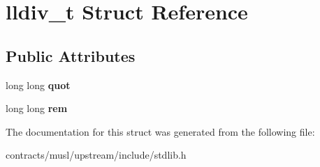 \hypertarget{structlldiv__t}{}\section{lldiv\+\_\+t Struct Reference}
\label{structlldiv__t}
\subsection*{Public Attributes}
\begin{DoxyCompactItemize}
\item 
\mbox{\label{structlldiv__t_ae4d4bccdf22f41e052073f5790c5ec37}} 
long long {\bfseries quot}
\item 
\mbox{\label{structlldiv__t_a32d4596a917aa9b496c8a49178a0e3c6}} 
long long {\bfseries rem}
\end{DoxyCompactItemize}


The documentation for this struct was generated from the following file\+:\begin{DoxyCompactItemize}
\item 
contracts/musl/upstream/include/stdlib.\+h\end{DoxyCompactItemize}
